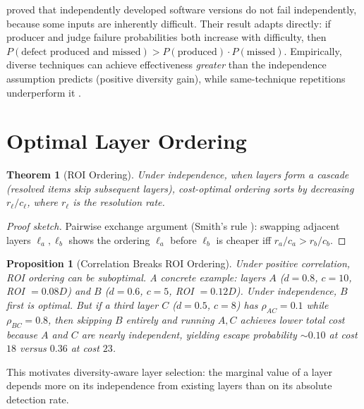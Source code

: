 \documentclass[11pt, a4paper, logo, copyright]{googledeepmind}
\newtheorem{theorem}{Theorem}[section]
\newtheorem{proposition}{Proposition}[section]
\begin{document}
\citet{littlewood1993, littlewood2000} proved that independently developed software versions do not fail independently, because some inputs are inherently difficult. Their result adapts directly: if producer and judge failure probabilities both increase with difficulty, then $P(\text{defect produced and missed}) > P(\text{produced}) \cdot P(\text{missed})$. Empirically, diverse techniques can achieve effectiveness \emph{greater} than the independence assumption predicts (positive diversity gain), while same-technique repetitions underperform it \citep{littlewood2000}.


\section{Optimal Layer Ordering}
\label{sec:ordering}

\begin{theorem}[ROI Ordering]
\label{thm:ordering}
Under independence, when layers form a cascade (resolved items skip subsequent layers), cost-optimal ordering sorts by decreasing $r_\ell / c_\ell$, where $r_\ell$ is the resolution rate.
\end{theorem}

\begin{proof}[Proof sketch]
Pairwise exchange argument (Smith's rule \citep{smith1956}): swapping adjacent layers $\ell_a, \ell_b$ shows the ordering $\ell_a$ before $\ell_b$ is cheaper iff $r_a / c_a > r_b / c_b$.
\end{proof}

\begin{proposition}[Correlation Breaks ROI Ordering]
\label{prop:corrbreaks}
Under positive correlation, ROI ordering can be suboptimal. A concrete example: layers $A$ ($d=0.8$, $c=10$, ROI $= 0.08D$) and $B$ ($d=0.6$, $c=5$, ROI $= 0.12D$). Under independence, $B$ first is optimal. But if a third layer $C$ ($d=0.5$, $c=8$) has $\rho_{AC} = 0.1$ while $\rho_{BC} = 0.8$, then skipping $B$ entirely and running $A, C$ achieves lower total cost because $A$ and $C$ are nearly independent, yielding escape probability ${\sim}0.10$ at cost $18$ versus $0.36$ at cost $23$.
\end{proposition}

This motivates diversity-aware layer selection: the marginal value of a layer depends more on its independence from existing layers than on its absolute detection rate.
\end{document}
